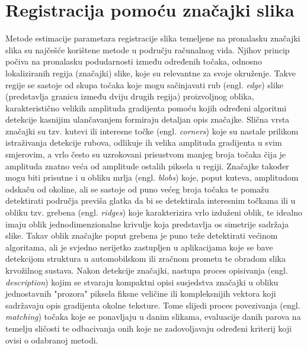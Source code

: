 \documentclass[times, utf8, diplomski]{fer}
\begin{document}
\section{Registracija pomoću značajki slika}
Metode estimacije parametara registracije slika temeljene na pronalasku značajki slika su najčešće korištene metode u području računalnog vida. Njihov princip počiva na pronalasku podudarnosti između određenih točaka, odnosno lokaliziranih regija (značajki) slike, koje su relevantne za svoje  okruženje. Takve regije se sastoje od skupa točaka koje mogu sačinjavati rub (engl. \textit{edge}) slike (predstavlja granicu između dviju drugih regija) proizvoljnog oblika, karakteristično velikih amplituda gradijenta pomoću kojih određeni algoritmi detekcije kasnijim ulančavanjem formiraju detaljan opis značajke. Slična vrsta značajki su tzv. kutevi ili interesne točke (engl. \textit{corners}) koje su nastale prilikom istraživanja detekcije rubova, odlikuje ih velika amplituda gradijenta u svim smjerovim, a vrlo često su uzrokovani prisustvom manjeg broja točaka čija je amplituda znatno veća od amplitude ostalih piksela u regiji. Značajke također mogu biti prisutne i u obliku mrlja (engl. \textit{blobs}) koje, poput kuteva, amplitudom odskaču od okoline, ali se sastoje od puno većeg broja točaka te pomažu detektirati područja previša glatka da bi se detektirala interesnim točkama ili u obliku tzv. grebena (engl. \textit{ridges}) koje karakterizira vrlo izduženi oblik, te idealno imaju oblik jednodimenzionalne krivulje koja predstavlja os simetrije sadržaja slike. Takav oblik značajke poput grebena je puno teže detektirati većinom algoritama, ali je svjedno nerijetko zastupljen u aplikacijama koje se bave detekcijom struktura u automobilskom ili zračnom prometu te obradom slika krvožilnog sustava. Nakon detekcije značajki, nastupa proces opisivanja (engl. \textit{description}) kojim se stvaraju kompaktni opisi susjedstva značajki u obliku jednostavnih "prozora" piksela fiksne veličine ili kompleksnijih vektora koji sadržavaju opis gradijenta okolne teksture. Tome slijedi proces povezivanja (engl. \textit{matching}) točaka koje se ponavljaju u danim slikama, evaluacije danih parova na temelju sličosti te odbacivanja onih koje ne zadovoljavaju određeni kriterij koji ovisi o odabranoj metodi. 
\end{document}
